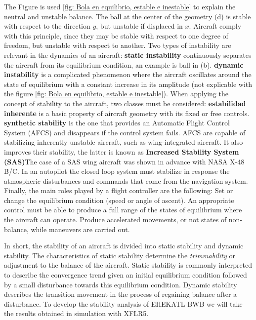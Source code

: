 The Figure is used \ref{fig: Bola en equilibrio, estable e inestable} to explain the neutral and unstable balance. 
%
The ball at the center of the geometry (d) is stable with respect to the direction $y$, but unstable if displaced in $x$. Aircraft comply with this principle, since they may be stable with respect to one degree of freedom, but unstable with respect to another. 
%
Two types of instability are relevant in the dynamics of an aircraft: \textbf{static instability} continuously separates the aircraft from its equilibrium condition, an example is ball in (b). \textbf{dynamic instability} is a complicated phenomenon where the aircraft oscillates around the state of equilibrium with a constant increase in its amplitude (not explicable with the figure \ref{fig: Bola en equilibrio, estable e inestable}).
%
When applying the concept of stability to the aircraft, two classes must be considered: \textbf{estabilidad inherente} is a basic property of aircraft geometry with its fixed or free controls. \textbf{synthetic stability} is the one that provides an Automatic Flight Control System (AFCS) and disappears if the control system fails. 
%
AFCS are capable of stabilizing inherently unstable aircraft, such as wing-integrated aircraft. It also improves their stability, the latter is known as \textbf{Increased Stability System (SAS)}The case of a SAS wing aircraft was shown in advance with NASA X-48 B/C. 
%
In an autopilot the closed loop system must stabilize in response the atmospheric disturbances and commands that come from the navigation system. 
%
Finally, the main roles played by a flight controller are the following: Set or change the equilibrium condition (speed or angle of ascent). An appropriate control must be able to produce a full range of the states of equilibrium where the aircraft can operate. Produce accelerated movements, or not states of non-balance, while maneuvers are carried out.

In short, the stability of an aircraft is divided into static stability and dynamic stability. 
%
The characteristics of static stability determine the \textit{trimmability} or adjustment to the balance of the aircraft. Static stability is commonly interpreted to describe the convergence trend given an initial equilibrium condition followed by a small disturbance towards this equilibrium condition.
%
Dynamic stability describes the transition movement in the process of regaining balance after a disturbance. 
%
To develop the stability analysis of EHEKATL BWB we will take the results obtained in simulation with XFLR5. 

